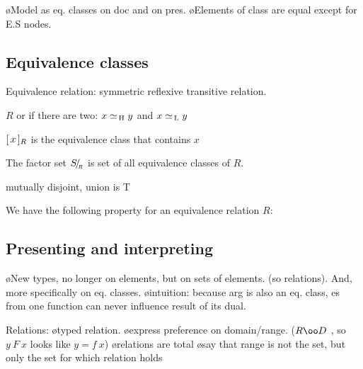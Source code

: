 \bl
\o Model as eq. classes on doc and on pres.
\o Elements of class are equal except for E.S nodes.
\el


\subsection{Equivalence classes}

Equivalence relation: symmetric reflexive
transitive relation.

$R$ or if there are two:  $x \simeq_{\, \mathrm H} y$  and $x \simeq_{\, \mathrm L} y$ 


$[\,{x}\,]_{{R}}$ is the equivalence class that contains $x$



The factor set ${S}\!/_{{_{\!\!{R}}}}$ is set of all equivalence classes of $R$.

mutually disjoint, union is T


We have the following property for an equivalence relation $R$:








\subsection{Presenting and interpreting}

\bl
\o New types, no longer on elements, but on sets of elements. (so relations). And, more specifically on eq. classes.
\o intuition: because arg is also an eq. class, es from one function can never influence result of its dual.
\el


Relations: 
\bl
\o typed relation. 
\o express preference on domain/range. ($R \oo D$ , so $y~F~x$ looks like $y = f~x$)
\o relations are total
\o say that range is not the set, but only the set for which relation holds
\el

